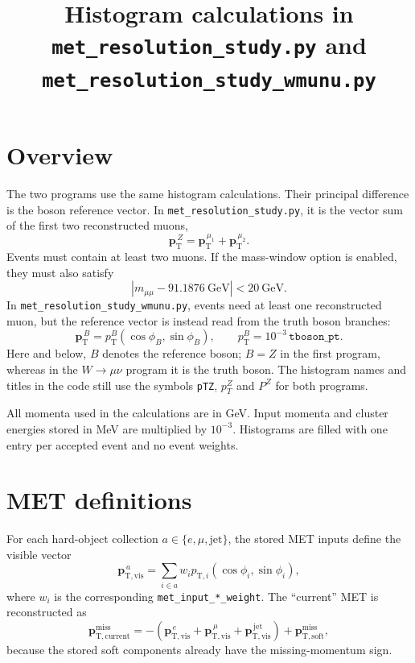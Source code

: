 \documentclass[11pt,a4paper]{article}
\title{Histogram calculations in \texttt{met\_resolution\_study.py} and
\texttt{met\_resolution\_study\_wmunu.py}}
\author{}
\date{}
\newcommand{\vpt}{\boldsymbol{p}_{\mathrm{T}}}
\newcommand{\vmet}[1]{\boldsymbol{p}_{\mathrm{T},#1}^{\mathrm{miss}}}
\begin{document}
\maketitle

\section{Overview}

The two programs use the same histogram calculations.  Their principal
difference is the boson reference vector.  In
\texttt{met\_resolution\_study.py}, it is the vector sum of the first two
reconstructed muons,
\begin{equation}
  \vpt^{\,Z}=\vpt^{\,\mu_1}+\vpt^{\,\mu_2}.
\end{equation}
Events must contain at least two muons.  If the mass-window option is enabled,
they must also satisfy
\begin{equation}
  |m_{\mu\mu}-91.1876~\mathrm{GeV}|<20~\mathrm{GeV}.
\end{equation}
In \texttt{met\_resolution\_study\_wmunu.py}, events need at least one
reconstructed muon, but the reference vector is instead read from the truth
boson branches:
\begin{equation}
  \vpt^{\,B}
  =p_{\mathrm{T}}^{B}(\cos\phi_B,\sin\phi_B),
  \qquad
  p_{\mathrm{T}}^{B}=10^{-3}\,\texttt{tboson\_pt}.
\end{equation}
Here and below, $B$ denotes the reference boson; $B=Z$ in the first program,
whereas in the $W\to\mu\nu$ program it is the truth boson.  The histogram
names and titles in the code still use the symbols \texttt{pTZ}, $p_T^Z$ and
$P^Z$ for both programs.

All momenta used in the calculations are in GeV.  Input momenta and cluster
energies stored in MeV are multiplied by $10^{-3}$.  Histograms are filled
with one entry per accepted event and no event weights.

\section{MET definitions}

For each hard-object collection $a\in\{e,\mu,\mathrm{jet}\}$, the stored MET
inputs define the visible vector
\begin{equation}
  \boldsymbol{p}_{\mathrm{T},\mathrm{vis}}^{\,a}
  =\sum_{i\in a}w_i p_{\mathrm{T},i}
    (\cos\phi_i,\sin\phi_i),
\end{equation}
where $w_i$ is the corresponding \texttt{met\_input\_*\_weight}.  The
``current'' MET is reconstructed as
\begin{equation}
  \vmet{\mathrm{current}}
  =-\left(\boldsymbol{p}_{\mathrm{T},\mathrm{vis}}^{\,e}
          +\boldsymbol{p}_{\mathrm{T},\mathrm{vis}}^{\,\mu}
          +\boldsymbol{p}_{\mathrm{T},\mathrm{vis}}^{\,\mathrm{jet}}\right)
   +\vmet{\mathrm{soft}},
  \label{eq:current-met}
\end{equation}
because the stored soft components already have the missing-momentum sign.
\end{document}
